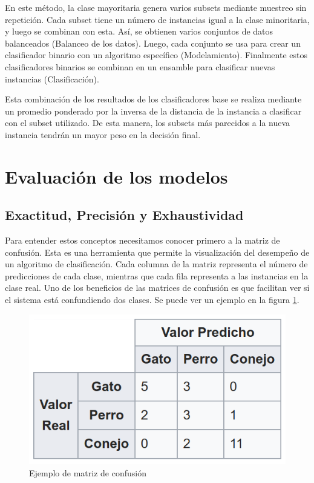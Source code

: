 En este método, la clase mayoritaria genera varios subsets mediante muestreo sin repetición. Cada subset tiene un número de instancias igual a la clase minoritaria, y luego se combinan con esta. Así, se obtienen varios conjuntos de datos balanceados (Balanceo de los datos). Luego, cada conjunto se usa para crear un clasificador binario con un algoritmo específico (Modelamiento). Finalmente estos clasificadores binarios se combinan en un ensamble para clasificar nuevas instancias (Clasificación).

Esta combinación de los resultados de los clasificadores base se realiza mediante un promedio ponderado por la inversa de la distancia de la instancia a clasificar con el subset utilizado. De esta manera, los subsets más parecidos a la nueva instancia tendrán un mayor peso en la decisión final.


\section{Evaluación de los modelos}

\subsection{Exactitud, Precisión y Exhaustividad}

Para entender estos conceptos necesitamos conocer primero a la matriz de confusión. Esta es una herramienta que permite la visualización del desempeño de un algoritmo de clasificación. Cada columna de la matriz representa el número de predicciones de cada clase, mientras que cada fila representa a las instancias en la clase real. Uno de los beneficios de las matrices de confusión es que facilitan ver si el sistema está confundiendo dos clases. Se puede ver un ejemplo en la figura \ref{fig:confussion}.

\begin{figure}[htbp]
    \centering
    \includegraphics[width=0.5\linewidth]{graficos/confussion_matrix.png}
    \caption{Ejemplo de matriz de confusión}
    \label{fig:confussion}
\end{figure}

